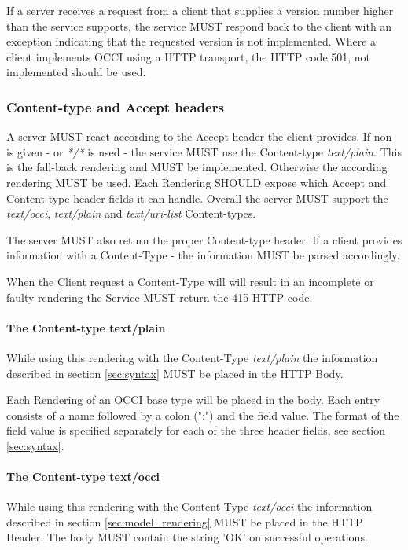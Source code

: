 \documentclass[10pt,a4paper]{article}
\begin{document}
If a server receives a request from a client that supplies a version
number higher than the service supports, the service MUST respond back
to the client with an exception indicating that the requested version
is not implemented. Where a client implements OCCI using a HTTP
transport, the HTTP code 501, not implemented should be used.

\subsubsection{Content-type and Accept headers}
A server MUST react according to the Accept header the client
provides. If non is given - or \textit{*/*} is used - the service MUST
use the Content-type \emph{text/plain}. This is the fall-back
rendering and MUST be implemented. Otherwise the according rendering
MUST be used. Each Rendering SHOULD expose which Accept and
Content-type header fields it can handle. Overall the server MUST
support the \textit{text/occi}, \textit{text/plain} and
\textit{text/uri-list} Content-types.

The server MUST also return the proper Content-type header. If a
client provides information with a Content-Type - the information MUST
be parsed accordingly.

When the Client request a Content-Type will will result in an
incomplete or faulty rendering the Service MUST return the 415 HTTP
code.

\paragraph{The Content-type text/plain}
While using this rendering with the Content-Type \textit{text/plain}
the information described in section \ref{sec:syntax} MUST be placed
in the HTTP Body.

Each Rendering of an OCCI base type will be placed in the body. Each
entry consists of a name followed by a colon (":") and the field
value. The format of the field value is specified separately for each
of the three header fields, see section \ref{sec:syntax}.

\paragraph{The Content-type text/occi}
While using this rendering with the Content-Type \textit{text/occi}
the information described in section \ref{sec:model_rendering} MUST be
placed in the HTTP Header. The body MUST contain the string 'OK' on
successful operations.
\end{document}
